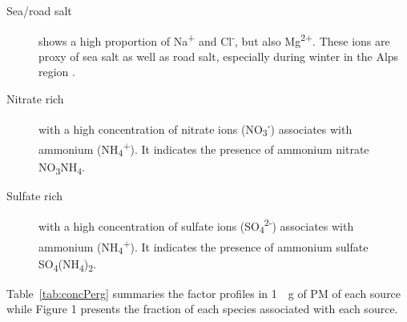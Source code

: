 \documentclass[12pt]{article}
\begin{document}
\begin{description}
\item[Sea/road salt] shows a high proportion of Na\textsuperscript{+}
and Cl\textsuperscript{-}, but also Mg\textsuperscript{2+}. These ions
are proxy of sea salt
\citep{belis_critical_2013,odowd_marine_1997,pio_climatology_2007} as well as road salt, especially during winter in the Alps
region \citep{air_rhone-alpes_influence_2012}.

\item[Nitrate rich] with a high concentration of nitrate ions
(NO\textsubscript{3}\textsuperscript{-}) associates with ammonium
(NH\textsubscript{4}\textsuperscript{+}). It indicates the presence of
ammonium nitrate NO\textsubscript{3}NH\textsubscript{4}.

\item[Sulfate rich] with a high concentration of sulfate ions
(SO\textsubscript{4}\textsuperscript{2-}) associates with ammonium
(NH\textsubscript{4}\textsuperscript{+}). It indicates the presence of
ammonium sulfate
SO\textsubscript{4}(NH\textsubscript{4})\textsubscript{2}.

\end{description}

Table~\ref{tab:concPerg} summaries the factor profiles in \SI{1}{{\mu}g} of PM of each source while
Figure 1 presents the fraction of each species associated with each
source.
\end{document}
